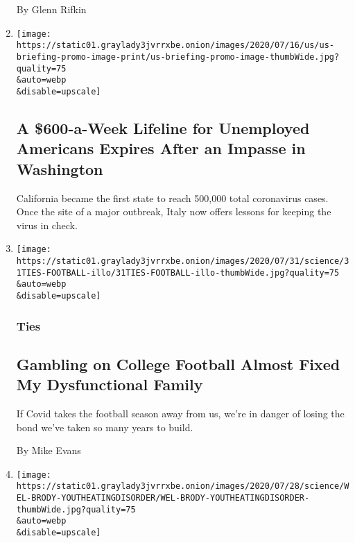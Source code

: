 \begin{enumerate}
  By Glenn Rifkin
\item
  \href{/2020/07/31/world/coronavirus-covid-19.html}{}

  \texttt{[image: https://static01.graylady3jvrrxbe.onion/images/2020/07/16/us/us-briefing-promo-image-print/us-briefing-promo-image-thumbWide.jpg?quality=75\\\&auto=webp\\\&disable=upscale]}

  \hypertarget{a-600-a-week-lifeline-for-unemployed-americans-expires-after-an-impasse-in-washington}{%
  \subsection{A \$600-a-Week Lifeline for Unemployed Americans Expires
  After an Impasse in
  Washington}\label{a-600-a-week-lifeline-for-unemployed-americans-expires-after-an-impasse-in-washington}}

  California became the first state to reach 500,000 total coronavirus
  cases. Once the site of a major outbreak, Italy now offers lessons for
  keeping the virus in check.
\item
  \href{/2020/07/31/well/family/gambling-on-college-football-almost-fixed-my-dysfunctional-family.html}{}

  \texttt{[image: https://static01.graylady3jvrrxbe.onion/images/2020/07/31/science/31TIES-FOOTBALL-illo/31TIES-FOOTBALL-illo-thumbWide.jpg?quality=75\\\&auto=webp\\\&disable=upscale]}

  \hypertarget{ties}{%
  \subsubsection{Ties}\label{ties}}

  \hypertarget{gambling-on-college-football-almost-fixed-my-dysfunctional-family}{%
  \subsection{Gambling on College Football Almost Fixed My Dysfunctional
  Family}\label{gambling-on-college-football-almost-fixed-my-dysfunctional-family}}

  If Covid takes the football season away from us, we're in danger of
  losing the bond we've taken so many years to build.

  By Mike Evans
\item
  \href{/interactive/2020/07/31/well/live/31healthquiz-07312020.html}{}

  \texttt{[image: https://static01.graylady3jvrrxbe.onion/images/2020/07/28/science/WEL-BRODY-YOUTHEATINGDISORDER/WEL-BRODY-YOUTHEATINGDISORDER-thumbWide.jpg?quality=75\\\&auto=webp\\\&disable=upscale]}


\end{enumerate}
